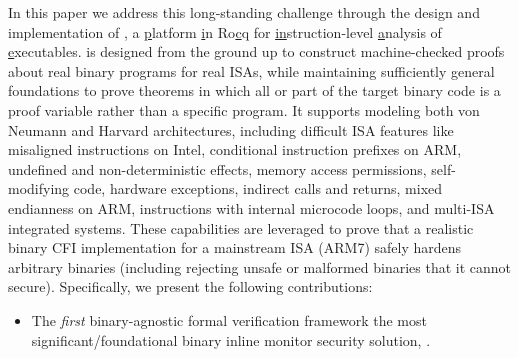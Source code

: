 {    In this paper we address this long-standing challenge through the design and implementation of \Picinae{}, a \uline{p}latform \uline{i}n Ro\uline{c}q for \uline{in}struction-level \uline{a}nalysis of \uline{e}xecutables.
    \Picinae{} is designed from the ground up to construct machine-checked proofs about real binary programs for real ISAs, while maintaining sufficiently general foundations to prove theorems in which all or part of the target binary code is a proof variable rather than a specific program.
    It supports modeling both von Neumann and Harvard architectures, including difficult ISA features like misaligned instructions on Intel, conditional instruction prefixes on ARM, undefined and non-deterministic effects, memory access permissions, self-modifying code, hardware exceptions, indirect calls and returns, mixed endianness on ARM, instructions with internal microcode loops, and multi-ISA integrated systems.
    These capabilities are leveraged to prove that a realistic binary CFI implementation for a mainstream ISA (ARM7) safely hardens arbitrary binaries (including rejecting unsafe or malformed binaries that it cannot secure).
    Specifically, we present the following contributions:
}

\begin{itemize} [topsep=0pt,itemsep=-1ex,partopsep=1ex,parsep=1ex, leftmargin=*]
    \item The \emph{first} binary-agnostic formal verification framework the most significant/foundational binary inline monitor security solution, \cfi.
\end{itemize}
